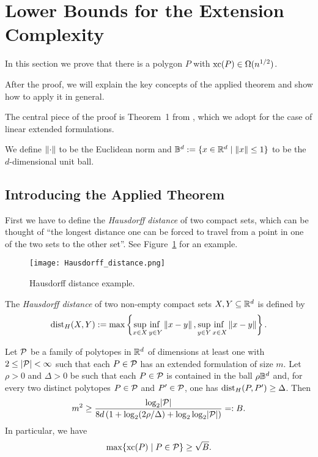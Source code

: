 \newpage

\section{Lower Bounds for the Extension Complexity}

In this section we prove that there is a polygon $P$ with $\xc(P) \in \Omega(n^{1/2})$.

After the proof, we will explain the key concepts of the applied theorem and show how to apply it in general.

The central piece of the proof is Theorem~1 from \textcite{averkov2016maximum}, which we adopt for the case of linear extended formulations.

We define $\norm{\cdot}$ to be the Euclidean norm and $\B^d := \{ x \in \R^d \mid \norm{x} \leq 1 \}$ to be the $d$-dimensional unit ball.



\subsection{Introducing the Applied Theorem}

First we have to define the \emph{Hausdorff distance} of two compact sets, which can be thought of ``the longest distance one can be forced to travel from a point in one of the two sets to the other set''. See Figure~\ref{fig:hausdorff} for an example.

\begin{figure}[ht]
  \centering
  \texttt{[image: Hausdorff\_distance.png]}
  \caption{Hausdorff distance example. \cite{rocchini2007hausdorff}}
  \label{fig:hausdorff}
\end{figure}

\begin{definition}
  The \emph{Hausdorff distance} of two non-empty compact sets $X, Y \subseteq \R^d$ is defined by $$ \dist_H(X,Y) := \max \left\{ \adjustlimits \sup_{x \in X} \inf_{y \in Y} \norm{x-y}, \adjustlimits \sup_{y \in Y} \inf_{x \in X} \norm{x-y} \right\} .$$
\end{definition}

\begin{theorem}\label{theorem:family}
  Let $\P$ be a family of polytopes in $\R^d$ of dimensions at least one with $2 \leq \abs{\P} < \infty $ such that each $P \in \P$ has an extended formulation of size $m$.
  Let $\rho > 0$ and $\Delta > 0$ be such that each $P \in \P$ is contained in the ball $\rho \B^d$ and,
  for every two distinct polytopes $P \in \P$ and $P' \in \P$, one has $\dist_H(P, P') \geq \Delta$.
  Then $$m^2 \geq \frac{\log_2 \abs{\P}}{8d \left(1 + \log_2 (2\rho/\Delta) + \log_2\log_2 \abs{\P} \right)} =: B.$$
  In particular, we have $$\max \{\xc(P) \mid P \in \P\}  \geq \sqrt{B} .$$
\end{theorem}



